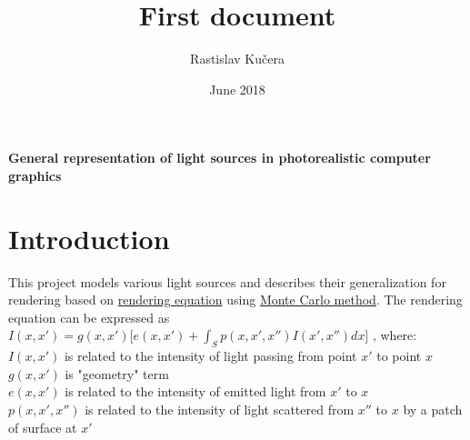 \documentclass[12pt, letterpaper]{article}
\title{First document}
\author{Rastislav Kučera}
\date{June 2018}
\begin{document}
\begin{titlepage}\centering
\thispagestyle{MyFirstPage}
\vspace*{\fill}
\LARGE \textbf{General representation of light sources in photorealistic computer graphics} 
\vspace*{\fill}
\end{titlepage}

\section{Introduction}
This project models various light sources 
and describes their generalization for rendering based on \href{http://www.cse.chalmers.se/edu/year/2011/course/TDA361/2007/rend_eq.pdf}{rendering equation} using \href{https://en.wikipedia.org/wiki/Monte_Carlo_method}{Monte Carlo method}.
The rendering equation can be expressed as \\
$I(x,x') = g(x,x')[e(x,x') + \int_{S}^{} p(x,x',x'')I(x',x'')dx$] , where:\\ 
$I(x,x')$ is related to the intensity of light passing from point $x'$ to point $x$\\
$g(x,x')$ is "geometry" term \\
$e(x,x')$ is related to the intensity of emitted light from $x'$ to $x$\\
$p(x,x',x'')$ is related to the intensity of light scattered from $x''$ to $x$ by a patch of surface at $x'$\\

\end{document}
